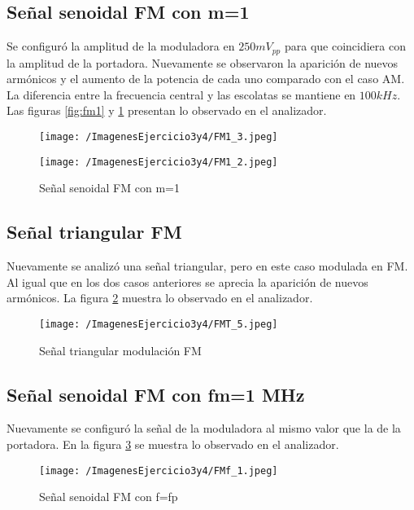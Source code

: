 \subsection{Señal senoidal FM con m=1}
Se configuró la amplitud de la moduladora en $250 mV_{pp}$ para que coincidiera con la amplitud de la portadora. Nuevamente se observaron la aparición de nuevos armónicos y el aumento de la potencia de cada uno comparado con el caso AM. La diferencia entre la frecuencia central y las escolatas se mantiene en $100 kHz$. Las figuras \ref{fig:fm1} y \ref{fig:fm1_5} presentan lo observado en el analizador.

\begin{figure}[H]
  \centering
  \begin{minipage}[b]{0.6\textwidth}
    \texttt{[image: /ImagenesEjercicio3y4/FM1\_3.jpeg]}
    \caption{Señal senoidal FM con m=1}
    \label{fig:fm1}
  \end{minipage}
  \hfill
  \begin{minipage}[b]{0.6\textwidth}
    \texttt{[image: /ImagenesEjercicio3y4/FM1\_2.jpeg]}
    \caption{Señal senoidal FM con m=1}
    \label{fig:fm1_5}
  \end{minipage}
\end{figure}

\subsection{Señal triangular FM}
Nuevamente se analizó una señal triangular, pero en este caso modulada en FM. Al igual que en los dos casos anteriores se aprecia la aparición de nuevos armónicos. La figura \ref{fig:fmt1} muestra lo observado en el analizador.

\begin{figure}[H]
	\centering
	\texttt{[image: /ImagenesEjercicio3y4/FMT\_5.jpeg]}
\caption{Señal triangular modulación FM}
	\label{fig:fmt1}
\end{figure}\textbf{}

\subsection{Señal senoidal FM con fm=1 MHz}

Nuevamente se configuró la señal de la moduladora al mismo valor que la de la portadora. En la figura \ref{fig:fmf} se muestra lo observado en el analizador.

\begin{figure}[H]
	\centering
	\texttt{[image: /ImagenesEjercicio3y4/FMf\_1.jpeg]}
\caption{Señal senoidal FM con f=fp}
	\label{fig:fmf}
\end{figure}
